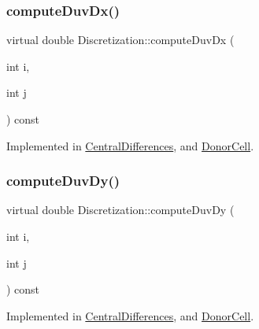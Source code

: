 \mbox{\label{classDiscretization_ab1c2aa237e13e7c4c9edd429de656795}} 
\subsubsection{\texorpdfstring{computeDuvDx()}{computeDuvDx()}}
{\footnotesize\ttfamily virtual double Discretization\+::compute\+Duv\+Dx (\begin{DoxyParamCaption}\item[{int}]{i,  }\item[{int}]{j }\end{DoxyParamCaption}) const\hspace{0.3cm}{\ttfamily [pure virtual]}}



Implemented in \mbox{\hyperlink{classCentralDifferences_a46104c3604f533bda430fc75110c956a}{Central\+Differences}}, and \mbox{\hyperlink{classDonorCell_a15d34de5bfaf3ef3bb8713f7b5474b56}{Donor\+Cell}}.

\mbox{\label{classDiscretization_a0bab86aef10a72e01b4f8102a3c91f84}} 
\subsubsection{\texorpdfstring{computeDuvDy()}{computeDuvDy()}}
{\footnotesize\ttfamily virtual double Discretization\+::compute\+Duv\+Dy (\begin{DoxyParamCaption}\item[{int}]{i,  }\item[{int}]{j }\end{DoxyParamCaption}) const\hspace{0.3cm}{\ttfamily [pure virtual]}}



Implemented in \mbox{\hyperlink{classCentralDifferences_a9d2f160a453d61537ff680afc2f9e67a}{Central\+Differences}}, and \mbox{\hyperlink{classDonorCell_a9255ed63d7d334c01be6204fcd457699}{Donor\+Cell}}.

\mbox{\label{classDiscretization_a69ba136ab7f8c09d805afca159cab428}} 
